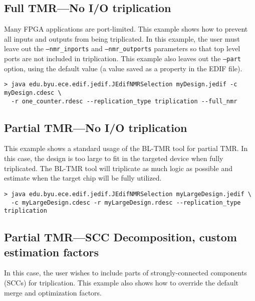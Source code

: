 \subsection{Full TMR---No I/O triplication}
Many FPGA applications are port-limited. This example shows how to prevent all 
inputs and outputs from being triplicated. In this example, the user must leave 
out the \texttt{--nmr\_inports} and \texttt{--nmr\_outports} parameters so that 
top level ports are not included in triplication. This example also leaves out 
the \texttt{--part} option, using the default value (a value saved as a
property in the EDIF file).

\begin{verbatim}
> java edu.byu.ece.edif.jedif.JEdifNMRSelection myDesign.jedif -c myDesign.cdesc \
  -r one_counter.rdesc --replication_type triplication --full_nmr
\end{verbatim}
\subsection{Partial TMR---No I/O triplication}
This example shows a standard usage of the BL-TMR tool for partial TMR\@. In this 
case, the design is too large to fit in the targeted device when fully 
triplicated. The BL-TMR tool will triplicate as much logic as possible and 
estimate when the target chip will be fully utilized.


\begin{verbatim}
> java edu.byu.ece.edif.jedif.JEdifNMRSelection myLargeDesign.jedif \
  -c myLargeDesign.cdesc -r myLargeDesign.rdesc --replication_type triplication 
\end{verbatim}

\subsection{Partial TMR---SCC Decomposition, custom estimation factors}
In this case, the user wishes to include parts of strongly-connected components 
(SCCs) for triplication. This example also shows how to override the default
merge and optimization factors.


